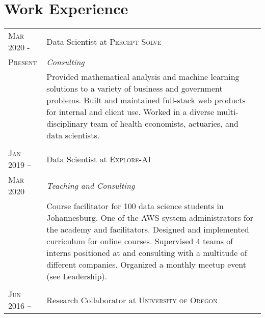 \section{Work Experience}

\begin{supertabular}{p{1.8cm}|p{12cm}}
	\textsc{Mar 2020 -}  		& Data Scientist at \textsc{Percept Solve} \\
	\textsc{Present}			& \emph{Consulting} \\
								& \footnotesize{Provided mathematical analysis and machine learning solutions to a variety of business and government problems. Built and maintained full-stack web products for internal and client use. Worked in a diverse multi-disciplinary team of health economists, actuaries, and data scientists.} \\
	 \\
	\textsc{Jan 2019 --}  		& Data Scientist at \textsc{Explore-AI} \\
	\textsc{Mar 2020}			& \emph{Teaching and Consulting} \\
								& \footnotesize{Course facilitator for 100 data science students in Johannesburg. One of the AWS system administrators for the academy and facilitators. Designed and implemented curriculum for online courses. Supervised 4 teams of interns positioned at and consulting with a multitude of different companies. Organized a monthly meetup event (see Leadership).} \\
	 \\
	\textsc{Jun 2016 --}    	& Research Collaborator at \textsc{University of Oregon} \\

\end{supertabular}

